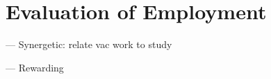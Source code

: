 \chapter{Evaluation of Employment}

--- Synergetic: relate vac work to study

--- Rewarding

\begin{comment}
lorem ipsum blah blah blah
\end{comment}
